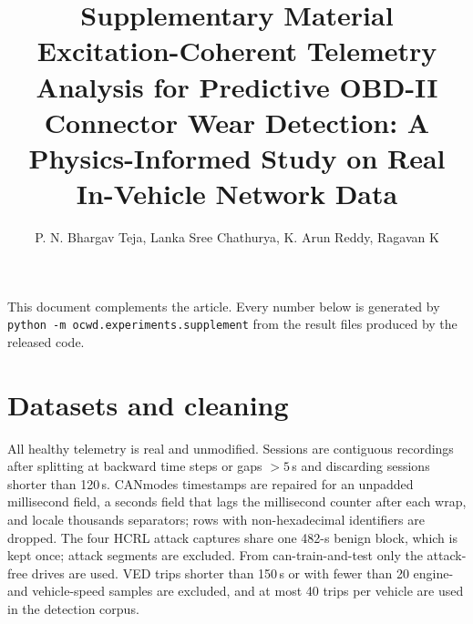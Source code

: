\documentclass[10pt]{article}
\title{Supplementary Material\\[4pt]\large Excitation-Coherent Telemetry Analysis for Predictive OBD-II Connector Wear Detection: A Physics-Informed Study on Real In-Vehicle Network Data}
\author{P. N. Bhargav Teja, Lanka Sree Chathurya, K. Arun Reddy, Ragavan K}
\date{}
\begin{document}
\maketitle
\noindent This document complements the article. Every number below is generated by
\texttt{python -m ocwd.experiments.supplement} from the result files produced by the released code.
\tableofcontents
\section{Datasets and cleaning}
All healthy telemetry is real and unmodified. Sessions are contiguous recordings after splitting at
backward time steps or gaps $>5$\,s and discarding sessions shorter than 120\,s. CANmodes
timestamps are repaired for an unpadded millisecond field, a seconds field that lags the
millisecond counter after each wrap, and locale thousands separators; rows with non-hexadecimal
identifiers are dropped. The four HCRL attack captures share one 482-s benign block, which is kept
once; attack segments are excluded. From can-train-and-test only the attack-free drives are used.
VED trips shorter than 150\,s or with fewer than 20 engine- and vehicle-speed samples are excluded,
and at most 40 trips per vehicle are used in the detection corpus.
\begin{table}[!htbp]
\centering
\caption{Sessions per vehicle after cleaning.}\label{tab:s_sessions}
\footnotesize
{}
\end{table}
\end{document}
